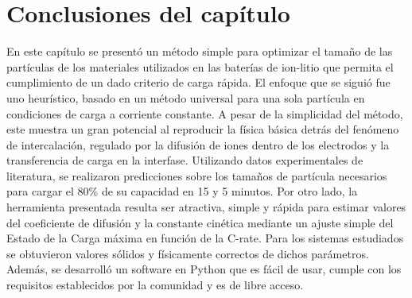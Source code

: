 \section{Conclusiones del capítulo}

En este capítulo se presentó un método simple para optimizar el tamaño de las 
partículas de los materiales utilizados en las baterías de ion-litio que permita
el cumplimiento de un dado criterio de carga rápida. El enfoque que se siguió
fue uno heurístico, basado en un método universal para una sola partícula en
condiciones de carga a corriente constante. A pesar de la simplicidad del método, 
este muestra un gran potencial al reproducir la física básica detrás del 
fenómeno de intercalación, regulado por la difusión de iones dentro de los 
electrodos y la transferencia de carga en la interfase. Utilizando datos 
experimentales de literatura, se realizaron predicciones sobre los tamaños de
partícula necesarios para cargar el 80\% de su capacidad en 15 y 5 minutos. 
Por otro lado, la herramienta presentada resulta ser atractiva, simple y rápida 
para estimar valores del coeficiente de difusión y la constante cinética mediante
un ajuste simple del Estado de la Carga máxima en función de la C-rate. Para los 
sistemas estudiados se obtuvieron valores sólidos y físicamente correctos de
dichos parámetros.
Además, se desarrolló un software en Python que es fácil 
de usar, cumple con los requisitos establecidos por la comunidad y es de libre
acceso.
